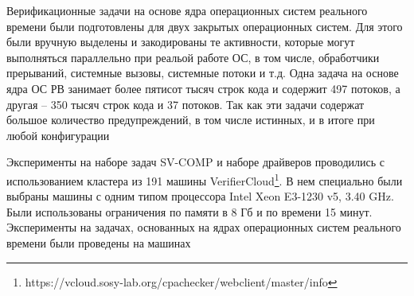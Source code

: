 Верификационные задачи на основе ядра операционных систем реального времени были подготовлены для двух закрытых операционных систем.
Для этого были вручную выделены и закодированы те активности, которые могут выполняться параллельно при реальой работе ОС, в том числе, обработчики прерываний, системные вызовы, системные потоки и т.д.
Одна задача на основе ядра ОС РВ занимает более пятисот тысяч строк кода и содержит 497 потоков, а другая -- 350 тысяч строк кода и 37 потоков.
Так как эти задачи содержат большое количество предупреждений, в том числе истинных, и в итоге при любой конфигурации

Эксперименты на наборе задач SV-COMP и наборе драйверов проводились с использованием кластера из 191 машины VerifierCloud\footnote{https://vcloud.sosy-lab.org/cpachecker/webclient/master/info}.
В нем специально были выбраны машины с одним типом процессора Intel Xeon E3-1230 v5, 3.40 GHz.
Были использованы ограничения по памяти в 8 Гб и по времени 15 минут.
Эксперименты на задачах, основанных на ядрах операционных систем реального времени были проведены на машинах 

